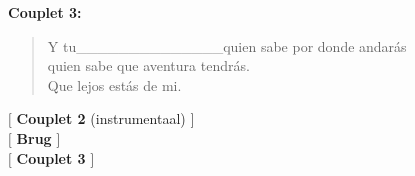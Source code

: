 \textbf{Couplet 3:}\\
\begin{verse}
Y\hspace{1em} tu\_{}\_{}\_{}\_{}\_{}\_{}\_{}\_{}\_{}\_{}\_{}\_{}\_{}\_{}quien sabe por donde andar\'{a}s \hspace{3em}\\
quien sabe que aventura tendr\'{a}s.\\
Que lejos est\'{a}s de mi. \hspace{3em} \hspace{3em} \hspace{3em}
\end{verse}

$[$ \textbf{Couplet 2} (instrumentaal) $]$\\
$[$ \textbf{Brug} $]$\\
$[$ \textbf{Couplet 3} $]$
